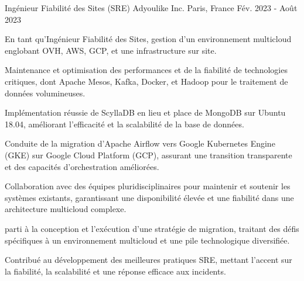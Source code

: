 \begin{cventries}
  \cventry
    {Ingénieur Fiabilité des Sites (SRE)} %
    {Adyoulike Inc.} %
    {Paris, France} %
    {Fév. 2023 - Août 2023} %
    {
      \begin{cvitems} %
        \item {En tant qu'Ingénieur Fiabilité des Sites, gestion d'un environnement multicloud englobant OVH, AWS, GCP, et une infrastructure sur site.}
        \item {Maintenance et optimisation des performances et de la fiabilité de technologies critiques, dont Apache Mesos, Kafka, Docker, et Hadoop pour le traitement de données volumineuses.}
        \item {Implémentation réussie de ScyllaDB en lieu et place de  MongoDB sur Ubuntu 18.04, améliorant l'efficacité et la scalabilité de la base de données.}
        \item {Conduite de la migration d'Apache Airflow vers Google Kubernetes Engine (GKE) sur Google Cloud Platform (GCP), assurant une transition transparente et des capacités d'orchestration améliorées.}
        \item {Collaboration avec des équipes pluridisciplinaires pour maintenir et soutenir les systèmes existants, garantissant une disponibilité élevée et une fiabilité dans une architecture multicloud complexe.}
        \item {parti à la  conception et l'exécution d'une stratégie de migration, traitant des défis spécifiques à un environnement multicloud et une pile technologique diversifiée.}
        \item {Contribué au développement des meilleures pratiques SRE, mettant l'accent sur la fiabilité, la scalabilité et une réponse efficace aux incidents.}
      \end{cvitems}
      
    }


\end{cventries}
